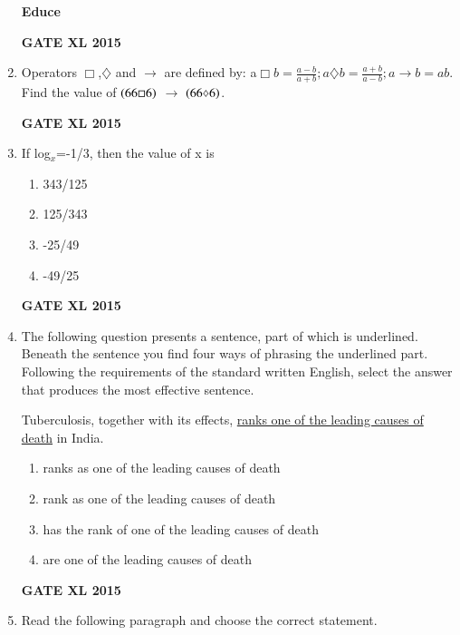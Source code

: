 \documentclass[journal,12pt,onecolumn]{IEEEtran}
\begin{document}
\begin{enumerate}
	\textbf{Educe}
    \begin{enumerate}
    \end{enumerate}
\hfill{\textbf{GATE XL 2015}}
\item Operators $\Box$,$\diamondsuit$ and $\rightarrow$ are defined by: a$\Box b=\frac{a-b}{a+b};a \diamondsuit b = \frac{a+b}{a-b};a\rightarrow b = ab$. Find the value of $\left(66\Box6\right)$ $\rightarrow$ $ \left(66\diamondsuit6\right)$.
    \begin{enumerate}
    \end{enumerate}
\hfill{\textbf{GATE XL 2015}}
\item If log$_x$=-1/3, then the value of x is
    \begin{enumerate}
            \item 343/125
            \item 125/343
            \item -25/49
            \item -49/25
    \end{enumerate}
\hfill{\textbf{GATE XL 2015}}
\item The following question presents a sentence, part of which is underlined. Beneath the sentence you find four ways of phrasing the underlined part. Following the requirements of the standard written English, select the answer that produces the most effective sentence.

	Tuberculosis, together with its effects, \underline{ranks one of the leading causes of death} in India.
    \begin{enumerate}
            \item ranks as one of the leading causes of death
            \item  rank as one of the leading causes of death
            \item has the rank of one of the leading causes of death
            \item are one of the leading causes of death
    \end{enumerate}
\hfill{\textbf{GATE XL 2015}}
\item Read the following paragraph and choose the correct statement.


\end{enumerate}
\end{document}
